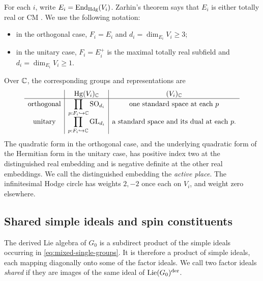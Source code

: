 For each $i$, write $E_i=\operatorname{End}_{\rm Hdg}(V_i)$.  Zarhin's theorem says
that $E_i$ is either totally real or CM \cite{Zarhin}.  We use the
following notation:
\begin{itemize}
\item in the orthogonal case, $F_i=E_i$ and
  $d_i=\dim_{E_i}V_i\ge3$;
\item in the unitary case, $F_i=E_i^+$ is the maximal totally real
  subfield and $d_i=\dim_{E_i}V_i\ge1$.
\end{itemize}
Over $\mathbb C$, the corresponding groups and representations are
\begin{equation}\label{eq:mixed-single-groups}
 \begin{array}{c|c|c}
 &\operatorname{Hg}(V_i)_{\mathbb C}&(V_i)_{\mathbb C}\\ \hline
 \text{orthogonal}&\displaystyle\prod_{p:F_i\hookrightarrow\mathbb C}
       \mathrm{SO}_{d_i}
   &\text{one standard space at each }p\\[3pt]
 \text{unitary}&\displaystyle\prod_{p:F_i\hookrightarrow\mathbb C}
       \mathrm{GL}_{d_i}
   &\text{a standard space and its dual at each }p .
 \end{array}
\end{equation}
The quadratic form in the orthogonal case, and the underlying quadratic
form of the Hermitian form in the unitary case, has positive index two
at the distinguished real embedding and is negative definite at the
other real embeddings.  We call the distinguished embedding the
\emph{active place}.  The infinitesimal Hodge circle has weights
$2,-2$ once each on $V_i$, and weight zero elsewhere.

\subsection{Shared simple ideals and spin constituents}

The derived Lie algebra of $G_0$ is a subdirect product of the simple
ideals occurring in \eqref{eq:mixed-single-groups}.  It is therefore
a product of simple ideals, each mapping diagonally onto some of the
factor ideals.  We call two factor ideals \emph{shared} if they are
images of the same ideal of $\operatorname{Lie}(G_0)^{\rm der}$.

